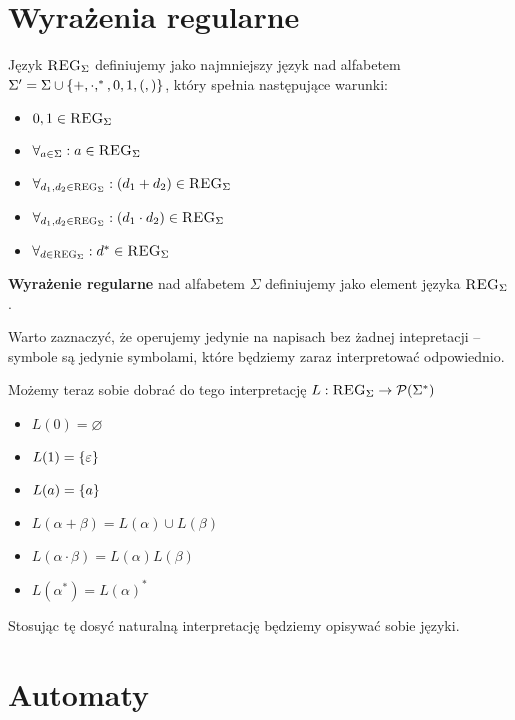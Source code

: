 \section{Wyrażenia regularne}

\begin{definition}
	Język \( \textsc{REG}_\Sigma \) definiujemy jako najmniejszy język nad alfabetem \( \Sigma' = \Sigma \cup \set{+, \cdot, ^*, 0, 1, (, )} \), który spełnia następujące warunki:

	\begin{itemize}
		\item \( 0, 1 \in \textsc{REG}_\Sigma \)
		\item \( \forall_{a \in \Sigma}: a \in \textsc{REG}_\Sigma \)
		\item \( \forall_{d_1, d_2 \in \textsc{REG}_\Sigma}: (d_1 + d_2) \in \textsc{REG}_\Sigma \)
		\item \( \forall_{d_1, d_2 \in \textsc{REG}_\Sigma}: (d_1 \cdot d_2) \in \textsc{REG}_\Sigma \)
		\item \( \forall_{d \in \textsc{REG}_\Sigma}: d^* \in \textsc{REG}_\Sigma \)
	\end{itemize}
\end{definition}

\begin{definition}
	\textbf{Wyrażenie regularne} nad alfabetem \( \Sigma \) definiujemy jako element języka  \( \textsc{REG}_\Sigma \).

\end{definition}

Warto zaznaczyć, że operujemy jedynie na napisach bez żadnej intepretacji -- symbole są jedynie symbolami, które będziemy zaraz interpretować odpowiednio.

Możemy teraz sobie dobrać do tego interpretację \( L: \reg{\Sigma} \rightarrow \powerset\pars{\Sigma^*} \)
\begin{itemize}
	\item \( L(0) = \varnothing \)
	\item \( L(1) = \set{\eps} \)
	\item \( L(a) = \set{a} \)
	\item \( L(\alpha + \beta) = L(\alpha) \cup L(\beta) \)
	\item \( L(\alpha \cdot \beta) = L(\alpha)L(\beta) \)
	\item \( L(\alpha^*) = L(\alpha)^* \)
\end{itemize}

Stosując tę dosyć naturalną interpretację będziemy opisywać sobie języki.

\section{Automaty}

